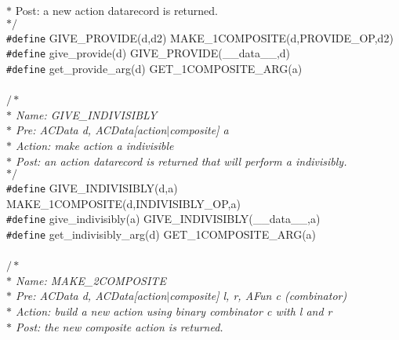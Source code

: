 \begin{flushleft}
{\hspace*{1\indentation}$\ast$ Post: a new action datarecord is returned.\mbox{}\\
\hspace*{1\indentation}$\ast/$}\mbox{}\\
{\tt \#define} GIVE\_PROVIDE(d,d2) MAKE\_1COMPOSITE(d,PROVIDE\_OP,d2)\mbox{}\\
{\tt \#define} give\_provide(d) GIVE\_PROVIDE(\_\_data\_\_,d)\mbox{}\\
{\tt \#define} get\_provide\_arg(d) GET\_1COMPOSITE\_ARG(a)\mbox{}\\
\mbox{}\\
{$/\ast$\it{}\mbox{}\\
\hspace*{1\indentation}$\ast$ Name: GIVE\_INDIVISIBLY\mbox{}\\
\hspace*{1\indentation}$\ast$ Pre: ACData d, ACData[action$\mid$composite] a\mbox{}\\
\hspace*{1\indentation}$\ast$ Action: make action a indivisible \mbox{}\\
\hspace*{1\indentation}$\ast$ Post: an action datarecord is returned that will perform a indivisibly.\mbox{}\\
\hspace*{1\indentation}$\ast/$}\mbox{}\\
{\tt \#define} GIVE\_INDIVISIBLY(d,a) MAKE\_1COMPOSITE(d,INDIVISIBLY\_OP,a)\mbox{}\\
{\tt \#define} give\_indivisibly(a) GIVE\_INDIVISIBLY(\_\_data\_\_,a)\mbox{}\\
{\tt \#define} get\_indivisibly\_arg(d) GET\_1COMPOSITE\_ARG(a)\mbox{}\\
\mbox{}\\
{$/\ast$\it{}\mbox{}\\
\hspace*{1\indentation}$\ast$ Name: MAKE\_2COMPOSITE\mbox{}\\
\hspace*{1\indentation}$\ast$ Pre: ACData d, ACData[action$\mid$composite] l, r, AFun c (combinator)\mbox{}\\
\hspace*{1\indentation}$\ast$ Action: build a new action using binary combinator c with l and r\mbox{}\\
\hspace*{1\indentation}$\ast$ Post: the new composite action is returned.\mbox{}\\
}
\end{flushleft}
